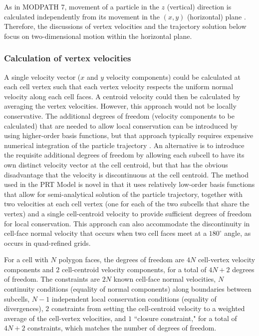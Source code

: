 As in MODPATH 7, movement of a particle in the $z$ (vertical) direction is calculated independently from its movement in the $(x, y)$ (horizontal) plane \citep{pollock2016modpath7} . Therefore, the discussions of vertex velocities and the trajectory solution below focus on two-dimensional motion within the horizontal plane.

\subsubsection{Calculation of vertex velocities}

A single velocity vector ($x$ and $y$ velocity components) could be calculated at each cell vertex such that each vertex velocity respects the uniform normal velocity along each cell faces. A centroid velocity could then be calculated by averaging the vertex velocities. However, this approach would not be locally conservative. The additional degrees of freedom (velocity components to be calculated) that are needed to allow local conservation can be introduced by using higher-order basis functions, but that approach typically requires expensive numerical integration of the particle trajectory \citep{zhang2012}. An alternative is to introduce the requisite additional degrees of freedom by allowing each subcell to have its own distinct velocity vector at the cell centroid, but that has the obvious disadvantage that the velocity is discontinuous at the cell centroid. The method used in the PRT Model is novel in that it uses relatively low-order basis functions that allow for semi-analytical solution of the particle trajectory, together with two velocities at each cell vertex (one for each of the two subcells that share the vertex) and a single cell-centroid velocity to provide sufficient degrees of freedom for local conservation. This approach can also accommodate the discontinuity in cell-face normal velocity that occurs when two cell faces meet at a $180^\circ$ angle, as occurs in quad-refined grids.

For a cell with $N$ polygon faces, the degrees of freedom are $4N$ cell-vertex velocity components and $2$ cell-centroid velocity components, for a total of $4N + 2$ degrees of freedom. The constraints are $2N$ known cell-face normal velocities, $N$ continuity conditions (equality of normal components) along boundaries between subcells, $N - 1$ independent local conservation conditions (equality of divergences), $2$ constraints from setting the cell-centroid velocity to a weighted average of the cell-vertex velocities, and $1$ ``closure constraint," for a total of $4N + 2$ constraints, which matches the number of degrees of freedom.

